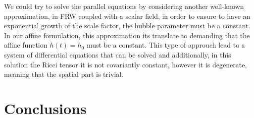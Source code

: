 \documentclass[10pt,a4paper]{article}
\begin{document}
We could try to solve the parallel equations by considering another well-known approximation, in FRW coupled with a scalar field, in order to ensure
to have an exponential growth of the scale factor, the hubble parameter must be a constant. In our affine formulation, this approximation its translate to demanding
that the affine function $h(t) = h_0$ must be a constant. This type of approuch lead to a system of differential equations that can be solved and additionally,
in this solution the Ricci tensor it is not covariantly constant, however it is degenerate, meaning that the spatial part is trivial. 



\section{Conclusions}
\end{document}
